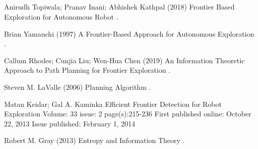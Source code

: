 \documentclass{article}
\begin{document}
\subsection{}

\pagebreak

  
\begin{thebibliography}{1}


 Anirudh Topiwala; Pranav Inani; Abhishek Kathpal
\newblock (2018)
\newblock Frontier Based Exploration for Autonomous Robot
.

Brian Yamauchi
\newblock (1997)
\newblock  A Frontier-Based Approach for Autonomous Exploration
.

Callum Rhodes; Cunjia Liu; Wen-Hua Chen
\newblock (2019)
\newblock An Information Theoretic Approach to Path Planning for Frontier Exploration
.

Steven M. LaValle
\newblock (2006)
\newblock Planning Algorithm
.

Matan Keidar; Gal A. Kaminka
\newblock Efficient Frontier Detection for Robot Exploration
\newblock Volume: 33 issue: 2
\newblock page(s):215-236
\newblock First published online: October 22, 2013
\newblock Issue published: February 1, 2014

Robert M. Gray
\newblock (2013)
\newblock Entropy and Information Theory
.



\end{thebibliography}


\end{document}
